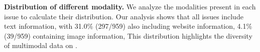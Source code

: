 \textbf{Distribution of different modality.} 
We analyze the modalities present in each issue to calculate their distribution. Our analysis shows that all issues include text information, with 31.0\% (297/959) also including website information, 4.1\% (39/959) containing image information, This distribution highlights the diversity of multimodal data on \Swebenchx.


     
